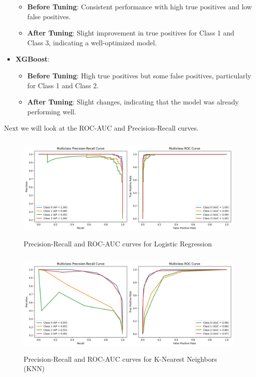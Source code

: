 \documentclass[12pt]{report}
\begin{document}
\begin{itemize}
		\vspace{-1.25em}	
		\begin{itemize}
				\setlength\itemsep{-1.5em}
        \item \textbf{Before Tuning}: Consistent performance with high true positives and low false positives.
        \item \textbf{After Tuning}: Slight improvement in true positives for Class 1 and Class 3, indicating a well-optimized model.
			\end{itemize}
		\item \textbf{XGBoost}:
		\vspace{-1.25em}	
		\begin{itemize}
				\setlength\itemsep{-1.5em}
        \item \textbf{Before Tuning}: High true positives but some false positives, particularly for Class 1 and Class 2.
        \item \textbf{After Tuning}: Slight changes, indicating that the model was already performing well.
    \end{itemize}
\end{itemize}

Next we will look at the ROC-AUC and Precision-Recall curves.

\begin{figure}[H]
    \centering
    \includegraphics[height=14em]{ra_pr_LR.png}
    \caption{Precision-Recall and ROC-AUC curves for Logistic Regression}
    \label{ra_pr_LR}
\end{figure}

\begin{figure}[H]
    \centering
    \includegraphics[height=14em]{ra_pr_KNN.png}
    \caption{Precision-Recall and ROC-AUC curves for K-Nearest Neighbors (KNN)}
    \label{ra_pr_KNN}
\end{figure}
\end{document}
